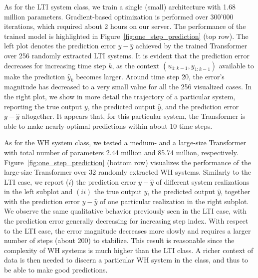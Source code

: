 \documentclass{article}
\begin{document}
As for the LTI system class, we train a single (small) architecture with 1.68 million parameters.
Gradient-based optimization is performed over 300'000 iterations, which required about 2 hours on our server.
The performance of the trained model is highlighted in Figure~\ref{fig:one_step_prediction} (top row). The left plot denotes the prediction error $y - \hat y$ achieved by the trained Transformer over 256 randomly extracted LTI systems.
It is evident that the prediction error decreases for increasing time step $k$, as the context 
 $(u_{1:k-1}, y_{1:k-1})$ available to make the prediction  $\hat y_k$   becomes larger.
Around time step 20, the error's magnitude has decreased to a very small value for all the 256 visualized cases. In the right plot, we show in more detail the trajectory of a particular system, reporting the true output $y$, the predicted output $\hat y$, and the prediction error $y - \hat y$ altogether. It appears that, for this particular system, the Transformer is able to make nearly-optimal predictions within about 10 time steps.

As for the WH system class, we tested a medium- and a large-size Transformer with total number of parameters  2.44 million  and 85.74 million, respectively.
Figure~\ref{fig:one_step_prediction} (bottom row) visualizes the performance of the large-size Transformer over 32 randomly extracted
WH systems.
Similarly to the LTI case, we report ($i$) the prediction error $y - \hat y$ of different system realizations in the left subplot and $(ii)$ the true output $y$, the predicted output $\hat y$, together with the prediction error 
$y - \hat y$ of one particular realization in the right subplot. We observe the same qualitative behavior previously seen in the LTI case, with the 
prediction error generally decreasing for increasing step index. 
With respect to the LTI case, the error magnitude decreases more slowly and requires a larger number of 
steps (about 200) to stabilize. This result is reasonable since  the complexity of WH systems is much higher than the LTI class. A richer context of data is then needed to discern a particular WH system in the class, and thus to be able to make good predictions.

 
\end{document}
